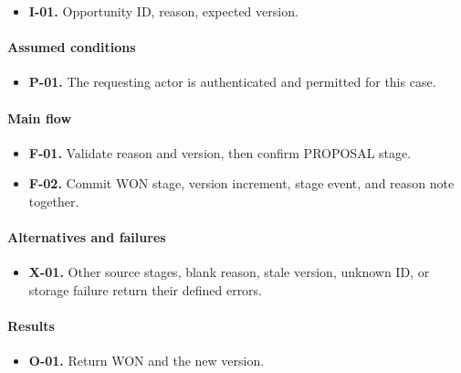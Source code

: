 \documentclass[10pt,a4paper]{article}
\begin{document}
\begin{itemize}

\item \textbf{I-01.} Opportunity ID, reason, expected version.

\end{itemize}

\paragraph{Assumed conditions}

\begin{itemize}

\item \textbf{P-01.} The requesting actor is authenticated and permitted for this case.

\end{itemize}

\paragraph{Main flow}

\begin{itemize}

\item \textbf{F-01.} Validate reason and version, then confirm PROPOSAL stage.

\item \textbf{F-02.} Commit WON stage, version increment, stage event, and reason note together.

\end{itemize}

\paragraph{Alternatives and failures}

\begin{itemize}

\item \textbf{X-01.} Other source stages, blank reason, stale version, unknown ID, or storage failure return their defined errors.

\end{itemize}

\paragraph{Results}

\begin{itemize}

\item \textbf{O-01.} Return WON and the new version.

\end{itemize}
\end{document}
